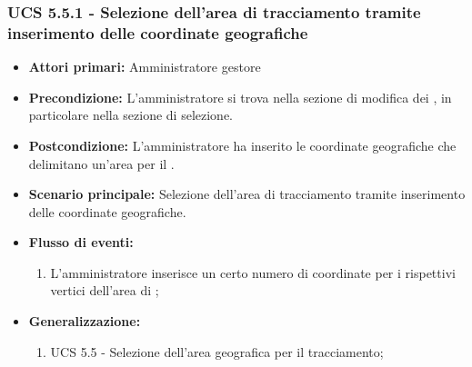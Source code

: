 \subsubsection{UCS 5.5.1 - Selezione dell'area di tracciamento tramite inserimento delle coordinate geografiche}%
\begin{itemize}
\item \textbf{Attori primari:} Amministratore gestore
\item \textbf{Precondizione:} L'amministratore si trova nella sezione di modifica dei , in particolare nella sezione di selezione.
\item \textbf{Postcondizione:} L'amministratore ha inserito le coordinate geografiche che delimitano un'area per il .
\item \textbf{Scenario principale:} Selezione dell'area di tracciamento tramite inserimento delle coordinate geografiche.
\item \textbf{Flusso di eventi:}
\begin{enumerate}
    \item L'amministratore inserisce un certo numero di coordinate per i rispettivi vertici dell'area di ;
\end{enumerate}
\item \textbf{Generalizzazione:}
	\begin{enumerate}
        \item UCS 5.5 - Selezione dell'area geografica per il tracciamento;
    \end{enumerate}
\end{itemize}

